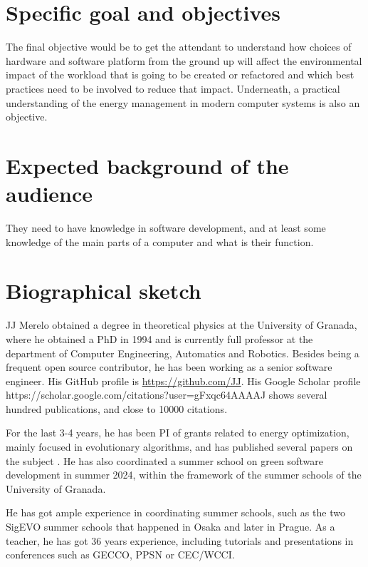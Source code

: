 \documentclass[a4paper]{article}
\begin{document}
\section{Specific goal and objectives}

The final objective would be to get the attendant to understand how choices of
hardware and software platform from the ground up will affect the environmental
impact of the workload that is going to be created or refactored and which best
practices need to be involved to reduce that impact. Underneath, a practical
understanding of the energy management in modern computer systems is also an
objective.

\section{Expected background of the audience}

They need to have knowledge in software development, and at least some knowledge
of the main parts of a computer and what is their function.

\section{Biographical sketch}

JJ Merelo obtained a degree in theoretical physics at the University of Granada,
where he obtained a PhD in 1994 and is currently full professor at the
department of Computer Engineering, Automatics and Robotics. Besides being a
frequent open source contributor, he has been working as a senior software
engineer. His GitHub profile is \url{https://github.com/JJ}. His Google Scholar
profile https://scholar.google.com/citations?user=gFxqc64AAAAJ shows several
hundred publications, and close to 10000 citations.

For the last 3-4 years, he has been PI of grants related to energy optimization,
mainly focused in evolutionary algorithms, and has published several papers on
the subject \cite{DBLP:conf/icsoft/GuervosGC23}. He has also coordinated a
summer school on green software development in summer 2024, within the framework
of the summer schools of the University of Granada.

He has got ample experience in coordinating summer schools, such as the two
SigEVO summer schools that happened in Osaka and later in Prague. As a teacher,
he has got 36 years experience, including tutorials and presentations in
conferences such as GECCO, PPSN or CEC/WCCI.
\end{document}
